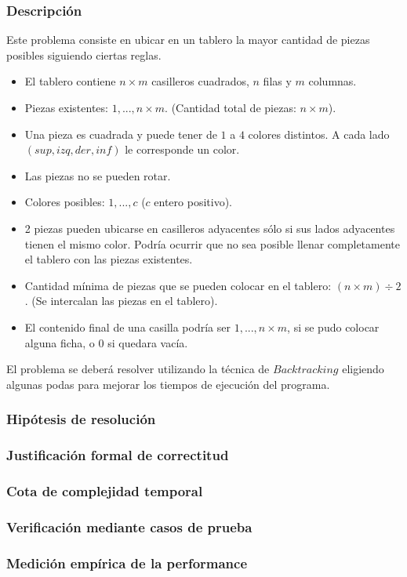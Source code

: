 \documentclass[11pt, a4paper, twoside]{article}
\begin{document}
{}

\subsubsection{Descripción}

Este problema consiste en ubicar en un tablero la mayor cantidad de piezas posibles siguiendo ciertas reglas.  

\begin{itemize}
\item El tablero contiene $n \times m$ casilleros cuadrados, $n$ filas y $m$ columnas. 
\item Piezas existentes: $1,...,n \times m$. (Cantidad total de piezas: $n \times m$).     
\item Una pieza es cuadrada y puede tener de $1$ a $4$ colores distintos. A cada lado $(sup, izq, der, inf)$ le corresponde un color. 
\item Las piezas no se pueden rotar.
\item Colores posibles: $1,...,c$ ($c$ entero positivo). 
\item 2 piezas pueden ubicarse en casilleros adyacentes sólo si sus lados adyacentes tienen el mismo color. Podría ocurrir que no sea posible llenar completamente el tablero con las piezas existentes. 
\item Cantidad mínima de piezas que se pueden colocar en el tablero: $(n \times m)\div 2$. (Se intercalan las piezas en el tablero).  
\item El contenido final de una casilla podría ser $1,...,n \times m$, si se pudo colocar alguna ficha, o $0$ si quedara vacía. 

\end{itemize} 

El problema se deberá resolver utilizando la técnica de $Backtracking$ eligiendo algunas podas para mejorar los tiempos de ejecución del programa.


\subsubsection{Hipótesis de resolución}

\subsubsection{Justificación formal de correctitud}

\subsubsection{Cota de complejidad temporal}

\subsubsection{Verificación mediante casos de prueba}

\subsubsection{Medición empírica de la performance}

\end{document}
